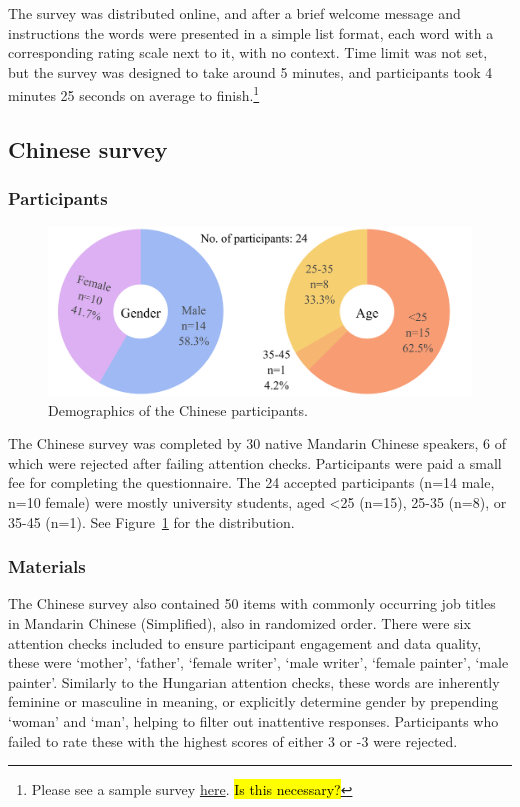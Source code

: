 \documentclass[11pt]{article}
\newcommand{\zh}[1]{\simplifiedchinesefont{#1}\rmfamily}
\begin{document}
The survey was distributed online, and after a brief welcome message and instructions the words were presented in a simple list format, each word with a corresponding rating scale next to it, with no context. Time limit was not set, but the survey was designed to take around 5 minutes, and participants took 4 minutes 25 seconds on average to finish.\footnote{Please see a sample survey \href{https://htmlpreview.github.io/?}{here}. \hl{Is this necessary?}} 




\subsection{Chinese survey}

\subsubsection{Participants}

\begin{figure}[!ht]
  \centering
  \includegraphics[width=\linewidth]{../demographics_zh}
  \caption{Demographics of the Chinese participants.}
  \label{fig:demographics_zh}
\end{figure}

The Chinese survey was completed by 30 native Mandarin Chinese speakers, 6 of which were rejected after failing attention checks. Participants were paid a small fee for completing the questionnaire. The 24 accepted participants (n=14 male, n=10 female) were mostly university students, aged <25 (n=15), 25-35 (n=8), or 35-45 (n=1). See Figure~\ref{fig:demographics_zh} for the distribution.

\subsubsection{Materials}

The Chinese survey also contained 50 items with commonly occurring job titles in Mandarin Chinese (Simplified), also in randomized order. There were six attention checks included to ensure participant engagement and data quality, these were \zh{妈妈} `mother', \zh{爸爸} `father', \zh{女作家} `female writer', \zh{男作家} `male writer', \zh{女画家} `female painter', \zh{男画家} `male painter'. Similarly to the Hungarian attention checks, these words are inherently feminine or masculine in meaning, or explicitly determine gender by prepending \zh{女} `woman' and \zh{男} `man', helping to filter out inattentive responses. Participants who failed to rate these with the highest scores of either 3 or -3 were rejected.
\end{document}
